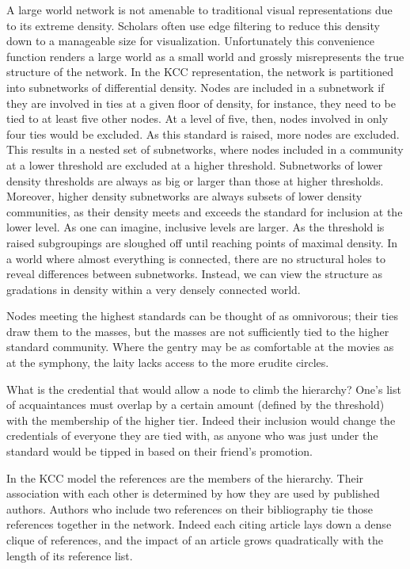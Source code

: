 \documentclass[]{book}
\theoremstyle{definition}
\theoremstyle{definition}
\theoremstyle{definition}
\theoremstyle{remark}
\begin{document}
A large world network is not amenable to traditional visual
representations due to its extreme density. Scholars often use edge
filtering to reduce this density down to a manageable size for
visualization. Unfortunately this convenience function renders a large
world as a small world and grossly misrepresents the true structure of
the network. In the KCC representation, the network is partitioned into
subnetworks of differential density. Nodes are included in a subnetwork
if they are involved in ties at a given floor of density, for instance,
they need to be tied to at least five other nodes. At a level of five,
then, nodes involved in only four ties would be excluded. As this
standard is raised, more nodes are excluded. This results in a nested
set of subnetworks, where nodes included in a community at a lower
threshold are excluded at a higher threshold. Subnetworks of lower
density thresholds are always as big or larger than those at higher
thresholds. Moreover, higher density subnetworks are always subsets of
lower density communities, as their density meets and exceeds the
standard for inclusion at the lower level. As one can imagine, inclusive
levels are larger. As the threshold is raised subgroupings are sloughed
off until reaching points of maximal density. In a world where almost
everything is connected, there are no structural holes to reveal
differences between subnetworks. Instead, we can view the structure as
gradations in density within a very densely connected world.

Nodes meeting the highest standards can be thought of as omnivorous;
their ties draw them to the masses, but the masses are not sufficiently
tied to the higher standard community. Where the gentry may be as
comfortable at the movies as at the symphony, the laity lacks access to
the more erudite circles.

What is the credential that would allow a node to climb the hierarchy?
One's list of acquaintances must overlap by a certain amount (defined by
the threshold) with the membership of the higher tier. Indeed their
inclusion would change the credentials of everyone they are tied with,
as anyone who was just under the standard would be tipped in based on
their friend's promotion.

In the KCC model the references are the members of the hierarchy. Their
association with each other is determined by how they are used by
published authors. Authors who include two references on their
bibliography tie those references together in the network. Indeed each
citing article lays down a dense clique of references, and the impact of
an article grows quadratically with the length of its reference list.
\end{document}
